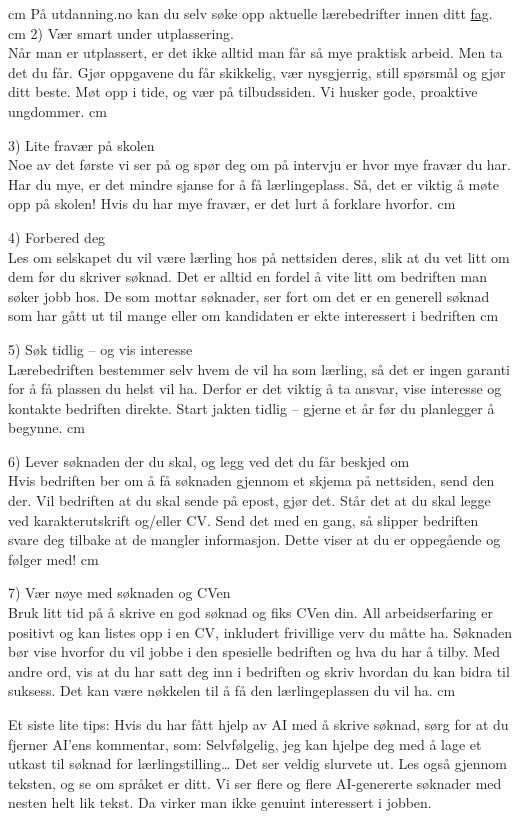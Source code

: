  cm
På utdanning.no kan du selv søke opp aktuelle lærebedrifter innen ditt \href{https://utdanning.no/finnlarebedrift/}{fag}.
 cm
2) Vær smart under utplassering. \\
Når man er utplassert, er det ikke alltid man får så mye praktisk arbeid. Men ta det du får. Gjør oppgavene du får skikkelig, vær nysgjerrig, still spørsmål og gjør ditt beste. Møt opp i tide, og vær på tilbudssiden. Vi husker gode, proaktive ungdommer.
 cm


3) Lite fravær på skolen\\
Noe av det første vi ser på og spør deg om på intervju er hvor mye fravær du har. Har du mye, er det mindre sjanse for å få lærlingeplass. Så, det er viktig å møte opp på skolen! Hvis du har mye fravær, er det lurt å forklare hvorfor.
 cm

4) Forbered deg\\
Les om selskapet du vil være lærling hos på nettsiden deres, slik at du vet litt om dem før du skriver søknad. Det er alltid en fordel å vite litt om bedriften man søker jobb hos. De som mottar søknader, ser fort om det er en generell søknad som har gått ut til mange eller om kandidaten er ekte interessert i bedriften
 cm

5) Søk tidlig – og vis interesse\\
Lærebedriften bestemmer selv hvem de vil ha som lærling, så det er ingen garanti for å få plassen du helst vil ha. Derfor er det viktig å ta ansvar, vise interesse og kontakte bedriften direkte. Start jakten tidlig – gjerne et år før du planlegger å begynne.
 cm

6) Lever søknaden der du skal, og legg ved det du får beskjed om\\
Hvis bedriften ber om å få søknaden gjennom et skjema på nettsiden, send den der. Vil bedriften at du skal sende på epost, gjør det. Står det at du skal legge ved karakterutskrift og/eller CV. Send det med en gang, så slipper bedriften svare deg tilbake at de mangler informasjon. Dette viser at du er oppegående og følger med!
 cm

7) Vær nøye med søknaden og CVen\\
Bruk litt tid på å skrive en god søknad og fiks CVen din. All arbeidserfaring er positivt og kan listes opp i en CV, inkludert frivillige verv du måtte ha. Søknaden bør vise hvorfor du vil jobbe i den spesielle bedriften og hva du har å tilby. Med andre ord, vis at du har satt deg inn i bedriften og skriv hvordan du kan bidra til suksess. Det kan være nøkkelen til å få den lærlingeplassen du vil ha.
 cm


Et siste lite tips:
Hvis du har fått hjelp av AI med å skrive søknad, sørg for at du fjerner AI’ens kommentar, som: Selvfølgelig, jeg kan hjelpe deg med å lage et utkast til søknad for lærlingstilling… Det ser veldig slurvete ut. Les også gjennom teksten, og se om språket er ditt. Vi ser flere og flere AI-genererte søknader med nesten helt lik tekst. Da virker man ikke genuint interessert i jobben.


\vskip 10pt


\vfil

\eject

